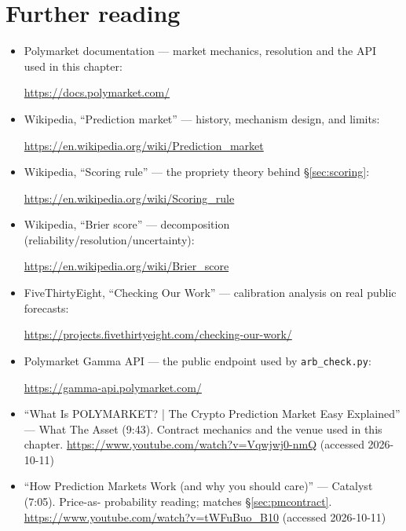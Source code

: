 \section*{Further reading}
\begin{itemize}
\item Polymarket documentation --- market mechanics, resolution and the API used in this
chapter:

\url{https://docs.polymarket.com/}
\item Wikipedia, ``Prediction market'' --- history, mechanism design, and limits:

\url{https://en.wikipedia.org/wiki/Prediction_market}
\item Wikipedia, ``Scoring rule'' --- the propriety theory behind \S\ref{sec:scoring}:

\url{https://en.wikipedia.org/wiki/Scoring_rule}
\item Wikipedia, ``Brier score'' --- decomposition (reliability/resolution/uncertainty):

\url{https://en.wikipedia.org/wiki/Brier_score}
\item FiveThirtyEight, ``Checking Our Work'' --- calibration analysis on real public
forecasts:

\url{https://projects.fivethirtyeight.com/checking-our-work/}
\item Polymarket Gamma API --- the public endpoint used by \texttt{arb\_check.py}:

\url{https://gamma-api.polymarket.com/}
\end{itemize}

\begin{rulebox}
\begin{itemize}
\item ``What Is POLYMARKET? | The Crypto Prediction Market Easy Explained'' --- What The
Asset (9:43). Contract mechanics and the venue used in this chapter.
\url{https://www.youtube.com/watch?v=Vqwjwj0-nmQ} (accessed 2026-10-11)
\item ``How Prediction Markets Work (and why you should care)'' --- Catalyst (7:05). Price-as-
probability reading; matches \S\ref{sec:pmcontract}.
\url{https://www.youtube.com/watch?v=tWFuBuo_B10} (accessed 2026-10-11)
\end{itemize}
\end{rulebox}
